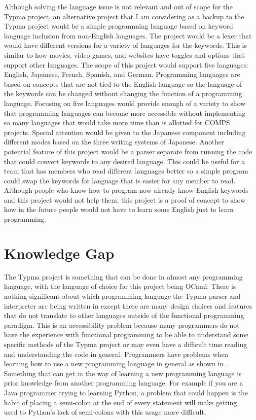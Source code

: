 \documentclass[10pt,twocolumn]{article}
\begin{document}
Although solving the language issue is not relevant and out of scope for the Typma project, an alternative project that I am considering as a backup to the Typma project would be a simple programming language based on keyword language inclusion from non-English languages. The project would be a lexer that would have different versions for a variety of languages for the keywords. This is similar to how movies, video games, and websites have toggles and options that support other languages. The scope of this project would support five languages: English, Japanese, French, Spanish, and German. Programming languages are based on concepts that are not tied to the English language so the language of the keywords can be changed without changing the function of a programming language. Focusing on five languages would provide enough of a variety to show that programming languages can become more accessible without implementing so many languages that would take more time than is allotted for COMPS projects. Special attention would be given to the Japanese component including different modes based on the three writing systems of Japanese. Another potential feature of this project would be a parser separate from running the code that could convert keywords to any desired language. This could be useful for a team that has members who read different languages better so a simple program could swap the keywords for language that is easier for any member to read. Although people who know how to program now already know English keywords and this project would not help them, this project is a proof of concept to show how in the future people would not have to learn some English just to learn programming.

\section{Knowledge Gap}

The Typma project is something that can be done in almost any programming language, with the language of choice for this project being OCaml. There is nothing significant about which programming language the Typma parser and interpreter are being written in except there are many design choices and features that do not translate to other languages outside of the functional programming paradigm. This is an accessibility problem because many programmers do not have the experience with functional programming to be able to understand some specific methods of the Typma project or may even have a difficult time reading and understanding the code in general. Programmers have problems when learning how to use a new programming language in general as shown in \textcite{Shrestha2020Here}. Something that can get in the way of learning a new programming language is prior knowledge from another programming language. For example if you are a Java programmer trying to learning Python, a problem that could happen is the habit of placing a semi-colon at the end of every statement will make getting used to Python's lack of semi-colons with this usage more difficult. 
\end{document}

